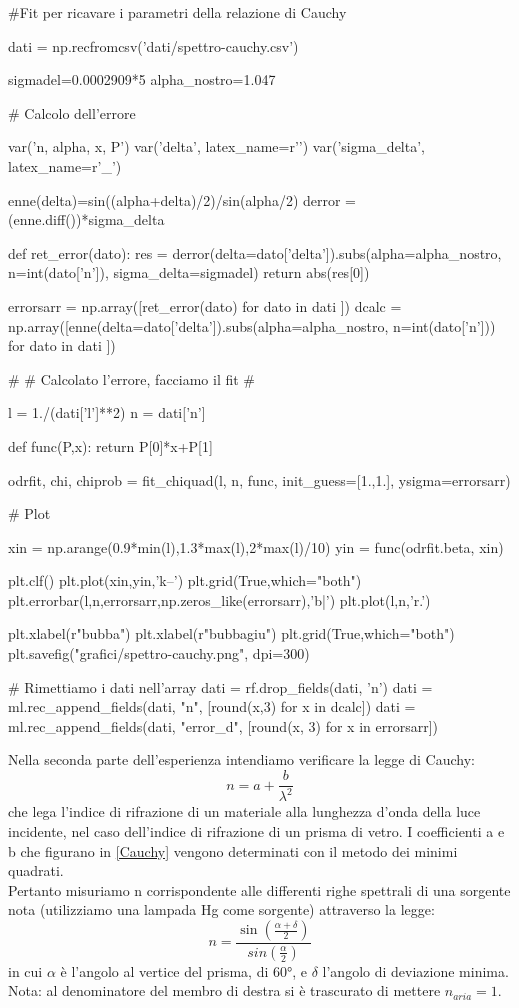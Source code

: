 \begin{sagesilent}
#Fit per ricavare i parametri della relazione di Cauchy

dati = np.recfromcsv('dati/spettro-cauchy.csv')

sigmadel=0.0002909*5
alpha_nostro=1.047

# Calcolo dell'errore

var('n, alpha, x, P')
var('delta', latex_name=r'\delta')
var('sigma_delta', latex_name=r'\sigma_{\delta}')

enne(delta)=sin((alpha+delta)/2)/sin(alpha/2)
derror = (enne.diff())*sigma_delta

def ret_error(dato):
  res = derror(delta=dato['delta']).subs(alpha=alpha_nostro, n=int(dato['n']), sigma_delta=sigmadel)
  return abs(res[0])

errorsarr = np.array([ret_error(dato) for dato in dati ])
dcalc = np.array([enne(delta=dato['delta']).subs(alpha=alpha_nostro, n=int(dato['n'])) for dato in dati ])

#
# Calcolato l'errore, facciamo il fit
#

l = 1./(dati['l']**2)
n = dati['n']

def func(P,x):
    return P[0]*x+P[1]

odrfit, chi, chiprob = fit_chiquad(l, n, func, init_guess=[1.,1.], ysigma=errorsarr)


# Plot

xin = np.arange(0.9*min(l),1.3*max(l),2*max(l)/10)
yin = func(odrfit.beta, xin)

plt.clf()
plt.plot(xin,yin,'k--')
plt.grid(True,which="both")
plt.errorbar(l,n,errorsarr,np.zeros_like(errorsarr),'b|')
plt.plot(l,n,'r.')

plt.xlabel(r"bubba")
plt.xlabel(r"bubbagiu")
plt.grid(True,which="both")
plt.savefig("grafici/spettro-cauchy.png", dpi=300)

# Rimettiamo i dati nell'array
dati = rf.drop_fields(dati, 'n')
dati = ml.rec_append_fields(dati, "n", [round(x,3) for x in dcalc])
dati = ml.rec_append_fields(dati, "error_d", [round(x, 3) for x in errorsarr])
\end{sagesilent}

Nella seconda parte dell'esperienza intendiamo verificare la legge di Cauchy:
\begin{equation}
n = a + \frac{b}{\lambda^2}
\label{Cauchy}
\end{equation}
che lega l'indice di rifrazione di un materiale alla lunghezza d'onda della luce incidente, nel caso dell'indice di rifrazione di un prisma di vetro.
I coefficienti a e b che figurano in \ref{Cauchy} vengono determinati con il metodo dei minimi quadrati. \\
Pertanto misuriamo n corrispondente alle differenti righe spettrali di una sorgente nota (utilizziamo una lampada Hg come sorgente) attraverso la legge:
\begin{equation}
n = \frac{\sin(\frac{\alpha + \delta}{2})}{sin(\frac{\alpha}{2})}
\label{n}
\end{equation}
in cui $\alpha$ è l'angolo al vertice del prisma, di $60°$, e $\delta$ l'angolo di deviazione minima. Nota: al denominatore del membro di destra si è trascurato di mettere $n_{aria}=1$.\\


